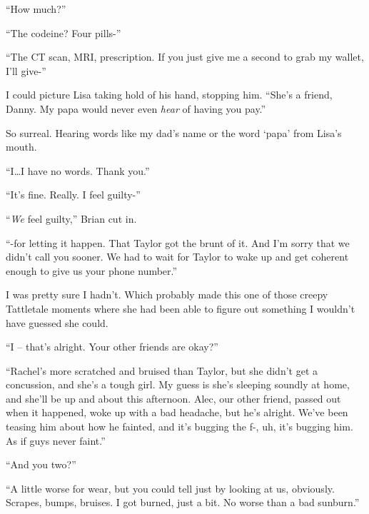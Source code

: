 ``How much?''



``The codeine?  Four pills-''



``The CT scan, MRI, prescription.  If you just give me a second to grab my wallet, I'll give-''



I could picture Lisa taking hold of his hand, stopping him.  ``She's a friend, Danny.  My papa would never even \emph{hear} of having you pay.''



So surreal.  Hearing words like my dad's name or the word `papa' from Lisa's mouth.



``I\ldots I have no words.  Thank you.''



``It's fine.  Really.  I feel guilty-''



``\emph{We} feel guilty,'' Brian cut in.



``-for letting it happen.  That Taylor got the brunt of it.  And I'm sorry that we didn't call you sooner.  We had to wait for Taylor to wake up and get coherent enough to give us your phone number.''



I was pretty sure I hadn't.  Which probably made this one of those creepy Tattletale moments where she had been able to figure out something I wouldn't have guessed she could.



``I – that's alright.  Your other friends are okay?''



``Rachel's more scratched and bruised than Taylor, but she didn't get a concussion, and she's a tough girl.  My guess is she's sleeping soundly at home, and she'll be up and about this afternoon.  Alec, our other friend, passed out when it happened, woke up with a bad headache, but he's alright.  We've been teasing him about how he fainted, and it's bugging the f-, uh, it's bugging him.  As if guys never faint.''



``And you two?''



``A little worse for wear, but you could tell just by looking at us, obviously.  Scrapes, bumps, bruises.  I got burned, just a bit.  No worse than a bad sunburn.''



